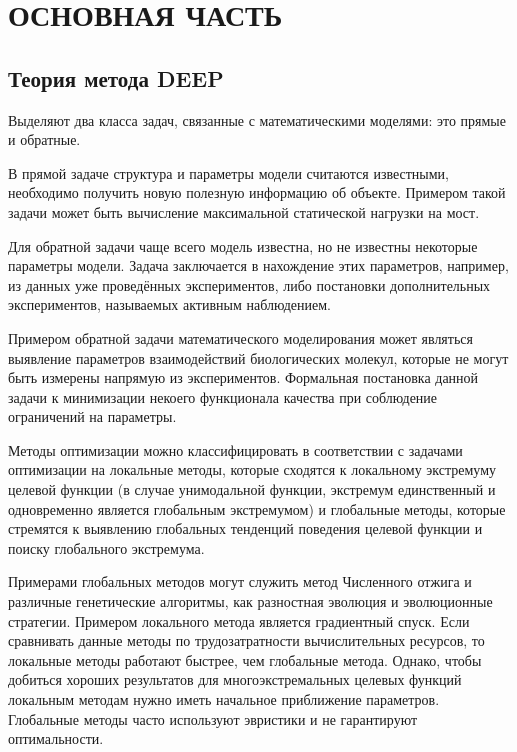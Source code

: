 \setcounter{figure}{0} \setcounter{table}{0} \setcounter{equation}{0}
\chapter*{ОСНОВНАЯ ЧАСТЬ}
\section*{Теория метода DEEP}

Выделяют два класса задач, связанные с математическими моделями: это прямые и обратные.

В прямой задаче структура и параметры модели считаются известными, необходимо получить новую полезную информацию об объекте. Примером такой задачи может быть вычисление максимальной статической нагрузки на мост.

Для обратной задачи чаще всего модель известна, но не известны некоторые параметры модели. Задача заключается в нахождение этих параметров, например, из данных уже проведённых экспериментов, либо постановки дополнительных экспериментов, называемых активным наблюдением.

Примером обратной задачи математического моделирования может являться выявление параметров взаимодействий биологических молекул, которые не могут быть измерены напрямую из экспериментов. Формальная постановка данной задачи к минимизации некоего функционала качества при соблюдение ограничений на параметры.

Методы оптимизации можно классифицировать в соответствии с задачами оптимизации на локальные методы, которые сходятся к локальному экстремуму целевой функции (в случае унимодальной функции, экстремум единственный и одновременно является глобальным экстремумом) и глобальные методы, которые стремятся к выявлению глобальных тенденций поведения целевой функции и поиску глобального экстремума.

Примерами глобальных методов могут служить метод Численного отжига и различные генетические алгоритмы, как разностная эволюция и эволюционные стратегии.
Примером локального метода является градиентный спуск.
Если сравнивать данные методы по трудозатратности вычислительных ресурсов, то локальные методы работают быстрее, чем глобальные метода.
Однако, чтобы добиться хороших результатов для многоэкстремальных целевых функций локальным методам нужно иметь начальное приближение параметров.
Глобальные методы часто используют эвристики и не гарантируют оптимальности.

